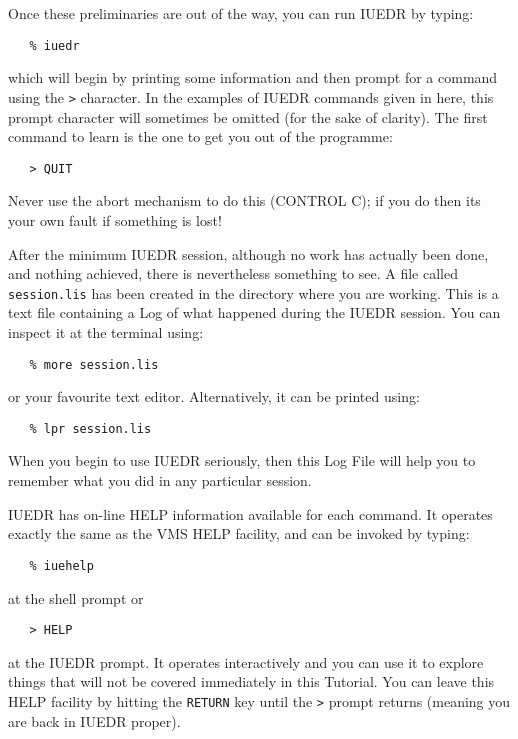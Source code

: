 Once these preliminaries are out of the way, you can run IUEDR by typing:

\begin{verbatim}
   % iuedr
\end{verbatim}

which will begin by printing some information and then prompt for a command
using the \verb+>+ character.  In the examples of IUEDR commands given in here,
this prompt character will sometimes be omitted (for the sake of clarity)\@.
The first command to learn is the one to get you out of the programme:

\begin{verbatim}
   > QUIT
\end{verbatim}

Never use the abort mechanism to do this (CONTROL C); if you do then its your
own fault if something is lost!

After the minimum IUEDR session, although no work has actually been done,
and nothing achieved, there is nevertheless something to see.
A file called \verb+session.lis+ has been created in the directory where you
are working.
This is a text file containing a Log of what happened during the IUEDR session.
You can inspect it at the terminal using:

\begin{verbatim}
   % more session.lis
\end{verbatim}

or your favourite text editor.
Alternatively, it can be printed using:

\begin{verbatim}
   % lpr session.lis
\end{verbatim}

When you begin to use IUEDR seriously, then this Log File will help you to
remember what you did in any particular session.

IUEDR has on-line HELP information available for each command.  It operates
exactly the same as the VMS HELP facility, and can be invoked by typing:

\begin{verbatim}
   % iuehelp
\end{verbatim}

at the shell prompt or

\begin{verbatim}
   > HELP
\end{verbatim}

at the IUEDR prompt.
It operates interactively and you can use it to explore things that will
not be covered immediately in this Tutorial.
You can leave this HELP facility by hitting the \verb+RETURN+ key until the
\verb+>+ prompt returns (meaning you are back in IUEDR proper)\@.


